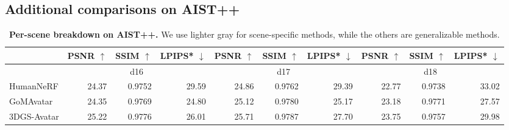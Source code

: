 \subsection{Additional comparisons on AIST++}
\begin{table}[t]
\caption{\textbf{Per-scene breakdown on AIST++.} We use lighter gray for scene-specific methods, while the others are generalizable methods.}
\label{tab: appendix_aistpp_breakdown}
\centering
\footnotesize
\begin{adjustbox}{width=1.0\linewidth}
\begin{tabular}{l|rrr|rrr|rrr}
\toprule
                                 & \multicolumn{1}{l}{\textbf{PSNR $\uparrow$}} & \multicolumn{1}{l}{\textbf{SSIM $\uparrow$}} & \multicolumn{1}{l|}{\textbf{LPIPS* $\downarrow$}} & \multicolumn{1}{l}{\textbf{PSNR $\uparrow$}}  & \multicolumn{1}{l}{\textbf{SSIM $\uparrow$}} & \multicolumn{1}{l|}{\textbf{LPIPS* $\downarrow$}} & \multicolumn{1}{l}{\textbf{PSNR $\uparrow$}} & \multicolumn{1}{l}{\textbf{SSIM $\uparrow$}} & \multicolumn{1}{l}{\textbf{LPIPS* $\downarrow$}}                        \\ \midrule
\rowcolor[HTML]{EFEFEF} 
                                 & \multicolumn{3}{c|}{\cellcolor[HTML]{EFEFEF}d16}                                             & \multicolumn{3}{c|}{\cellcolor[HTML]{EFEFEF}d17}                                             & \multicolumn{3}{c}{\cellcolor[HTML]{EFEFEF}d18}                                             \\ 
{\color[HTML]{9B9B9B} HumanNeRF} & {\color[HTML]{9B9B9B} 24.37} & {\color[HTML]{9B9B9B} 0.9752} & {\color[HTML]{9B9B9B} 29.59} & {\color[HTML]{9B9B9B} 24.86} & {\color[HTML]{9B9B9B} 0.9762} & {\color[HTML]{9B9B9B} 29.39} & {\color[HTML]{9B9B9B} 22.77} & {\color[HTML]{9B9B9B} 0.9738} & {\color[HTML]{9B9B9B} 33.02} \\
{\color[HTML]{9B9B9B} GoMAvatar} & {\color[HTML]{9B9B9B} 24.35} & {\color[HTML]{9B9B9B} 0.9769} & {\color[HTML]{9B9B9B} 24.80} & {\color[HTML]{9B9B9B} 25.12} & {\color[HTML]{9B9B9B} 0.9780} & {\color[HTML]{9B9B9B} 25.17} & {\color[HTML]{9B9B9B} 23.18} & {\color[HTML]{9B9B9B} 0.9771} & {\color[HTML]{9B9B9B} 27.57} \\
{\color[HTML]{9B9B9B} 3DGS-Avatar}    & {\color[HTML]{9B9B9B} 25.22} & {\color[HTML]{9B9B9B} 0.9776} & {\color[HTML]{9B9B9B} 26.01} & {\color[HTML]{9B9B9B} 25.71} & {\color[HTML]{9B9B9B} 0.9787} & {\color[HTML]{9B9B9B} 27.70} & {\color[HTML]{9B9B9B} 23.75} & {\color[HTML]{9B9B9B} 0.9757} & {\color[HTML]{9B9B9B} 29.98} \\

\end{tabular}
\end{adjustbox}
\end{table}
